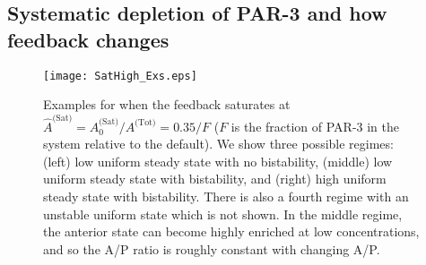 \documentclass[11pt]{article}
\newcommand{\6}[1]{#1_{\text{6}}}
\newcommand{\3}[1]{#1_{\text{3}}}
\newcommand{\Tot}[1]{#1^\text{(Tot)}}
\newcommand{\Sat}[1]{#1^\text{(Sat)}}
\begin{document}
\subsection{Systematic depletion of PAR-3 and how feedback changes \label{sec:howFB}}
\begin{figure}
\centering
\texttt{[image: SatHigh\_Exs.eps]}
\caption{\label{fig:SatHighEx}Examples for when the feedback saturates at $\Sat{\hat A}=\Sat{A}_0/\Tot{A}=0.35/F$ ($F$ is the fraction of PAR-3 in the system relative to the default). We show three possible regimes: (left) low uniform steady state with no bistability, (middle) low uniform steady state with bistability, and (right) high uniform steady state with bistability. There is also a fourth regime with an unstable uniform state which is not shown. In the middle regime, the anterior state can become highly enriched at low concentrations, and so the A/P ratio is roughly constant with changing A/P.}
\end{figure}
\end{document}
